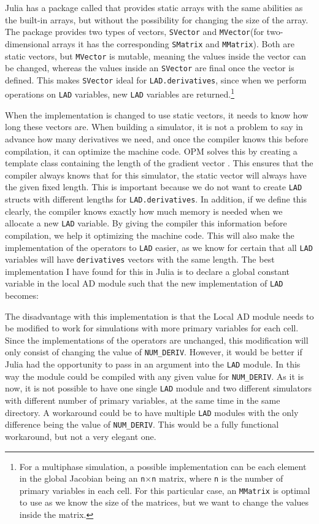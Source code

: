Julia has a package called \emph{\cite{StaticArrays}} that provides static arrays with the same abilities as the built-in arrays, but without the possibility for changing the size of the array. The package provides two types of vectors, \texttt{SVector} and \texttt{MVector}(for two-dimensional arrays it has the corresponding \texttt{SMatrix} and \texttt{MMatrix}). Both are static vectors, but \texttt{MVector} is mutable, meaning the values inside the vector can be changed, whereas the values inside an \texttt{SVector} are final once the vector is defined. This makes \texttt{SVector} ideal for \texttt{LAD.derivatives}, since when we perform operations on \texttt{LAD} variables, new \texttt{LAD} variables are returned.\footnote{For a multiphase simulation, a possible implementation can be each element in the global Jacobian being an \texttt{n}$\times$\texttt{n} matrix, where \texttt{n} is the number of primary variables in each cell. For this particular case, an \texttt{MMatrix} is optimal to use as we know the size of the matrices, but we want to change the values inside the matrix.} 

When the implementation is changed to use static vectors, it needs to know how long these vectors are. When building a simulator, it is not a problem to say in advance how many derivatives we need, and once the compiler knows this before compilation, it can optimize the machine code. OPM solves this by creating a template class containing the length of the gradient vector \citep{lauser2018local}. This ensures that the compiler always knows that for this simulator, the static vector will always have the given fixed length. This is important because we do not want to create \texttt{LAD} structs with different lengths for \texttt{LAD.derivatives}. In addition, if we define this clearly, the compiler knows exactly how much memory is needed when we allocate a new \texttt{LAD} variable. By giving the compiler this information before compilation, we help it optimizing the machine code. This will also make the implementation of the operators to \texttt{LAD} easier, as we know for certain that all \texttt{LAD} variables will have \texttt{derivatives} vectors with the same length. The best implementation I have found for this in Julia is to declare a global constant variable in the local AD module such that the new implementation of \texttt{LAD} becomes:

The disadvantage with this implementation is that the Local AD module needs to be modified to work for simulations with more primary variables for each cell. Since the implementations of the operators are unchanged, this modification will only consist of changing the value of \texttt{NUM\_DERIV}. However, it would be better if Julia had the opportunity to pass in an argument into the \texttt{LAD} module. In this way the module could be compiled with any given value for \texttt{NUM\_DERIV}. As it is now, it is not possible to have one single \texttt{LAD} module and two different simulators with different number of primary variables, at the same time in the same directory. A workaround could be to have multiple \texttt{LAD} modules with the only difference being the value of \texttt{NUM\_DERIV}. This would be a fully functional workaround, but not a very elegant one.

